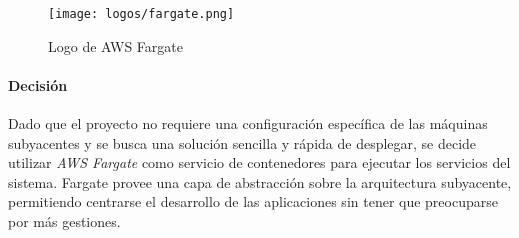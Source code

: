 \begin{figure}[H]
	\centering
	\texttt{[image: logos/fargate.png]}
	\caption{Logo de AWS Fargate~\textregistered}
	\label{fig:fargate}
\end{figure}

\paragraph{Decisión}
Dado que el proyecto no requiere una configuración específica de las máquinas
subyacentes y se busca una solución sencilla y rápida de desplegar, se decide
utilizar \textit{AWS Fargate} como servicio de contenedores para ejecutar los
servicios del sistema. Fargate provee una capa de abstracción sobre la
arquitectura subyacente, permitiendo centrarse el desarrollo de las
aplicaciones sin tener que preocuparse por más gestiones.
